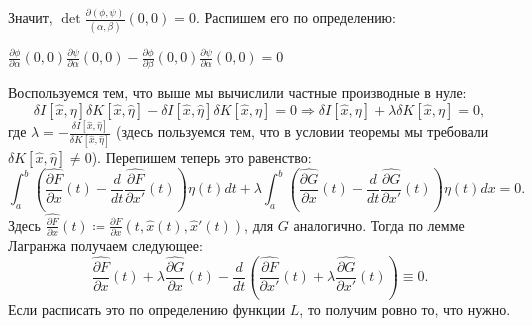 Значит, $\det \frac{\partial (\phi, \psi)}{(\alpha, \beta)}(0,0) = 0$. Распишем его по определению:
\begin{center}
$\frac{\partial \phi}{\partial \alpha}(0,0) \frac{\partial \psi}{\partial \alpha}(0,0) - \frac{\partial \phi}{\partial \beta}(0,0) \frac{\partial \psi}{\partial \alpha}(0,0) = 0$
\end{center}
Воспользуемся тем, что выше мы вычислили частные производные в нуле:
$$
\delta I[\widehat x, \eta] \delta K[\widehat x, \widehat \eta] - \delta I[\widehat x, \widehat \eta] \delta K[\widehat x, \eta] = 0 \Rightarrow
\delta I[\widehat x, \eta] + \lambda \delta K[\widehat x, \eta] = 0,
$$
где $\lambda = -\frac{\delta I[\widehat x, \widehat \eta]}{\delta K[\widehat x, \widehat \eta]}$ (здесь пользуемся тем, что в условии теоремы мы требовали $\delta K[\widehat{x}, \widehat{\eta}] \ne 0$).
Перепишем теперь это равенство:
$$\int_a^b \left(\widehat{\frac{\partial F}{\partial x}} (t) - \frac{d}{dt} \widehat{ \frac{\partial F}{\partial x'}}(t)\right) \eta(t) dt + \lambda \int_a^b \left(\widehat{\frac{\partial G}{\partial x}}(t) - \frac{d}{dt} \widehat{\frac{\partial G}{\partial x'}}(t)\right) \eta(t) dx = 0.$$
Здесь $\widehat{\frac{\partial F}{\partial x}} (t) \coloneq \frac{\partial F}{\partial x}(t, \widehat{x}(t), \widehat{x}'(t))$, для $G$ аналогично. Тогда по лемме Лагранжа получаем следующее:
$$
\widehat{\frac{\partial F}{\partial x}} (t) + \lambda \widehat{\frac{\partial G}{\partial x}}(t) - \frac{d}{dt}\left(\widehat{ \frac{\partial F}{\partial x'}}(t) + \lambda \widehat {\frac{\partial G}{\partial x'}}(t)\right) \equiv 0.$$
Если расписать это по определению функции $L$, то получим ровно то, что нужно.

\QED